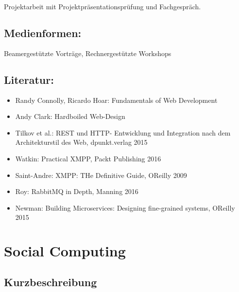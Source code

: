 Projektarbeit mit Projektpräsentationsprüfung und Fachgespräch.

\section{Medienformen:}\label{medienformen-30}

Beamergestützte Vorträge, Rechnergestützte Workshops

\section{Literatur:}\label{literatur-30}

\begin{itemize}
\tightlist
\item
  Randy Connolly, Ricardo Hoar: Fundamentals of Web Development
\item
  Andy Clark: Hardboiled Web-Design
\item
  Tilkov et al.: REST und HTTP- Entwicklung und Integration nach dem
  Architekturstil des Web, dpunkt.verlag 2015
\item
  Watkin: Practical XMPP, Packt Publishing 2016
\item
  Saint-Andre: XMPP: THe Definitive Guide, OReilly 2009
\item
  Roy: RabbitMQ in Depth, Manning 2016
\item
  Newman: Building Microservices: Designing fine-grained systems,
  OReilly 2015
\end{itemize}

\chapter{Social Computing}\label{social-computing}

\section{Kurzbeschreibung}\label{kurzbeschreibung-7}

